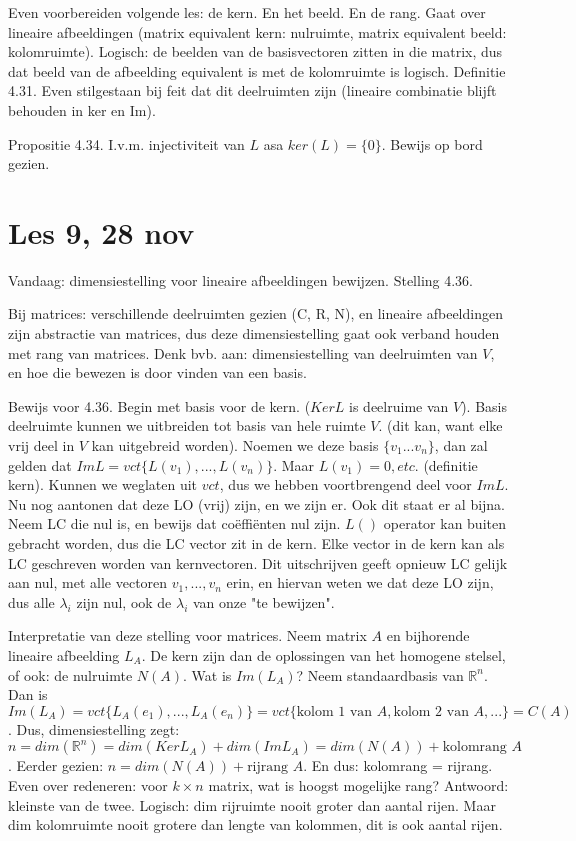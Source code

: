 \documentclass{article}
\begin{document}
Even voorbereiden volgende les: de kern. En het beeld. En de rang.  Gaat over lineaire afbeeldingen (matrix equivalent kern: nulruimte, matrix equivalent beeld: kolomruimte). Logisch: de beelden van de basisvectoren zitten in die matrix, dus dat beeld van de afbeelding equivalent is met de kolomruimte is logisch. 
Definitie 4.31. Even stilgestaan bij feit dat dit deelruimten zijn (lineaire combinatie blijft behouden in ker en Im). 

Propositie 4.34. I.v.m. injectiviteit van $L$ asa $ker(L)=\{0\}$. Bewijs op bord gezien. 

\section*{Les 9, 28 nov}

Vandaag: dimensiestelling voor lineaire afbeeldingen bewijzen. 
Stelling 4.36. 

Bij matrices: verschillende deelruimten gezien (C, R, N), en lineaire afbeeldingen zijn abstractie van matrices, dus deze dimensiestelling gaat ook verband houden met rang van matrices. 
Denk bvb. aan: dimensiestelling van deelruimten van $V$, en hoe die bewezen is door vinden van een basis. 

Bewijs voor 4.36. Begin met basis voor de kern. ($Ker L$ is deelruime van $V$). Basis deelruimte kunnen we uitbreiden tot basis van hele ruimte $V$. (dit kan, want elke vrij deel in $V$ kan uitgebreid worden). Noemen we deze basis $\{ v_1 ... v_n\} $, dan zal gelden dat $Im L = vct\{ L(v_1), ..., L(v_n)  \}$. Maar $L(v_1)=0, etc.$ (definitie kern). Kunnen we weglaten uit $vct$, dus we hebben voortbrengend deel voor $Im L$. Nu nog aantonen dat deze LO (vrij) zijn, en we zijn er. Ook dit staat er al bijna. Neem LC die nul is, en bewijs dat co\"effi\"enten nul zijn. 
$L()$ operator kan buiten gebracht worden, dus die LC vector zit in de kern. Elke vector in de kern kan als LC geschreven worden van kernvectoren. Dit uitschrijven geeft opnieuw LC gelijk aan nul, met alle vectoren $v_1,...,v_n$ erin, en hiervan weten we dat deze LO zijn, dus alle $\lambda_i$ zijn nul, ook de $\lambda_i$ van onze "te bewijzen". 

Interpretatie van deze stelling voor matrices. Neem matrix $A$ en bijhorende lineaire afbeelding $L_A$. De kern zijn dan de oplossingen van het homogene stelsel, of ook: de nulruimte $N(A)$. Wat is $Im(L_A)$? Neem standaardbasis van $\mathbb{R}^n$. Dan is $Im(L_A) = vct \{ L_A(e_1), ..., L_A(e_n)  \} = vct \{ 
 \text{kolom 1 van }A, \text{kolom 2 van } A, ... \} = C(A)$.  
Dus, dimensiestelling zegt: $n = dim(\mathbb{R}^n) = dim(Ker L_A) + dim(Im L_A) = dim(N(A)) + \text{kolomrang } A$. 
Eerder gezien: $n = dim( N(A)) + \text{rijrang } A$. 
En dus: kolomrang = rijrang. 
Even over redeneren: voor $k \times n$ matrix, wat is hoogst mogelijke rang? Antwoord: kleinste van de twee. Logisch: dim rijruimte nooit groter dan aantal rijen. Maar dim kolomruimte nooit grotere dan lengte van kolommen, dit is ook aantal rijen.   
\end{document}
